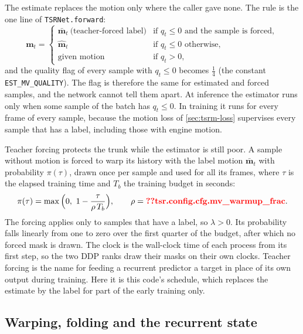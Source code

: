 The estimate replaces the motion only where the caller gave none. The rule is the one line of \texttt{TSRNet.forward}:
\begin{equation}\label{eq:tsrm-select}
\mathbf{m}_t=\begin{cases}\bar{\mathbf{m}}_t\ \text{(teacher-forced label)} & \text{if } q_t\le 0 \text{ and the sample is forced},\\ \hat{\mathbf{m}}_t & \text{if } q_t\le 0 \text{ otherwise},\\ \text{given motion} & \text{if } q_t>0,\end{cases}
\end{equation}
and the quality flag of every sample with $q_t\le 0$ becomes $\tfrac14$ (the constant \texttt{EST\_MV\_QUALITY}). The flag is therefore the same for estimated and forced samples, and the network cannot tell them apart. At inference the estimator runs only when some sample of the batch has $q_t\le 0$. In training it runs for every frame of every sample, because the motion loss of \cref{sec:tsrm-loss} supervises every sample that has a label, including those with engine motion.

Teacher forcing protects the trunk while the estimator is still poor. A sample without motion is forced to warp its history with the label motion $\bar{\mathbf{m}}_t$ with probability $\pi(\tau)$, drawn once per sample and used for all its frames, where $\tau$ is the elapsed training time and $T_b$ the training budget in seconds:
\begin{equation}\label{eq:tsrm-teacher}
\pi(\tau)=\max\Big(0,\ 1-\frac{\tau}{\rho\,T_b}\Big),\qquad \rho=\Res{tsr.config.cfg.mv_warmup_frac}.
\end{equation}
The forcing applies only to samples that have a label, so $\lambda>0$. Its probability falls linearly from one to zero over the first quarter of the budget, after which no forced mask is drawn. The clock is the wall-clock time of each process from its first step, so the two DDP ranks draw their masks on their own clocks. Teacher forcing is the name for feeding a recurrent predictor a target in place of its own output during training. Here it is this code's schedule, which replaces the estimate by the label for part of the early training only.

\subsection{Warping, folding and the recurrent state}\label{sec:tsrm-state}

